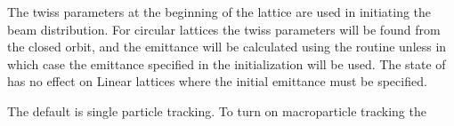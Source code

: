 {The twiss parameters at the beginning of the lattice are used in
initiating the beam distribution.  For circular lattices the twiss
parameters will be found from the closed orbit, and the emittance will
be calculated using the \bmad routine  unless
 in which case the emittance specified in the
initialization will be used. The state of  has no
effect on Linear lattices where the initial emittance must be
specified.

The default is single particle tracking. To turn on macroparticle
tracking the \vn{global%
This can be placed in the \vn{tao_params} namelist above, for example,
\begin{example}
  &tao_params
    n_v1_var_max  = 5
    n_d2_data_max = 6
    n_data_max    = 2000
    n_var_max     = 2000
    global%
    global%
  /
\end{example}

\section{Initializing Variables}\index{Initialization!Variables}
\label{s:init_var} 

}}
